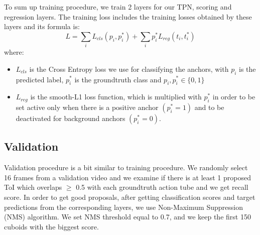 To sum up training procedure, we train 2 layers for our TPN, scoring and regression layers. The training loss includes the training losses
obtained by these layers and its formula is:
\[ L  =  \sum_iL_{cls}(p_i, p_i^*) + \sum_ip_i^*L_{reg}(t_i,t_i^*) \]
where:
\begin{itemize}
\item $L_{cls} $ is the Cross Entropy loss we use for classifying the anchors, with $p_i$ is the predicted label, $p_i^*$ is the groundtruth class and
  $p_i, p_i^* \in \{0,1\}$
\item $L_{reg} $ is the smooth-L1 loss function, which is multiplied  with $p_i^*$ in order to be set active only when there is a positive anchor $(p_i^* = 1)$
  and to be deactivated for background anchors $(p_i^* = 0)$.
\end{itemize}

\subsection{Validation}

Validation procedure is a bit similar to training procedure.
We randomly select 16 frames from a validation video and we examine if there is at least 1 proposed ToI
which overlaps $\ge$ 0.5 with each groundtruth action tube and we get recall score. 
In order to get good proposals, after getting classification scores and target predictions from the
corresponding layers, we use Non-Maximum Suppression (NMS) algorithm.  We set NMS threshold equal to 0.7,
and we keep the first 150 cuboids with the biggest score.

